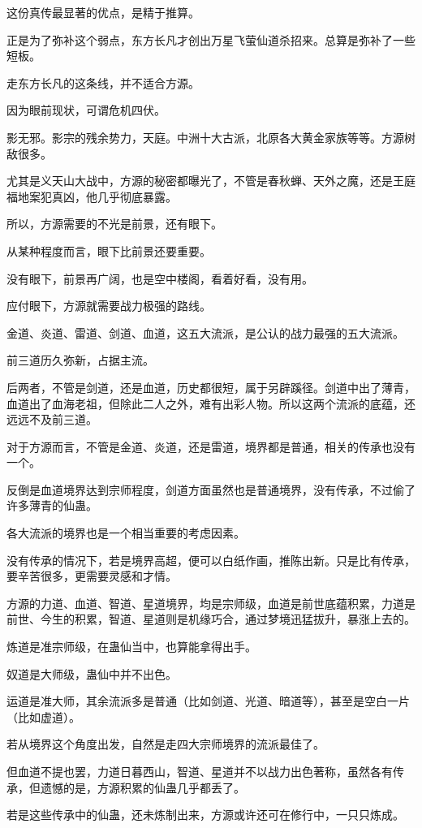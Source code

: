 \begin{this_body}
这份真传最显著的优点，是精于推算。

正是为了弥补这个弱点，东方长凡才创出万星飞萤仙道杀招来。总算是弥补了一些短板。

走东方长凡的这条线，并不适合方源。

因为眼前现状，可谓危机四伏。

影无邪。影宗的残余势力，天庭。中洲十大古派，北原各大黄金家族等等。方源树敌很多。

尤其是义天山大战中，方源的秘密都曝光了，不管是春秋蝉、天外之魔，还是王庭福地案犯真凶，他几乎彻底暴露。

所以，方源需要的不光是前景，还有眼下。

从某种程度而言，眼下比前景还要重要。

没有眼下，前景再广阔，也是空中楼阁，看着好看，没有用。

应付眼下，方源就需要战力极强的路线。

金道、炎道、雷道、剑道、血道，这五大流派，是公认的战力最强的五大流派。

前三道历久弥新，占据主流。

后两者，不管是剑道，还是血道，历史都很短，属于另辟蹊径。剑道中出了薄青，血道出了血海老祖，但除此二人之外，难有出彩人物。所以这两个流派的底蕴，还远远不及前三道。

对于方源而言，不管是金道、炎道，还是雷道，境界都是普通，相关的传承也没有一个。

反倒是血道境界达到宗师程度，剑道方面虽然也是普通境界，没有传承，不过偷了许多薄青的仙蛊。

各大流派的境界也是一个相当重要的考虑因素。

没有传承的情况下，若是境界高超，便可以白纸作画，推陈出新。只是比有传承，要辛苦很多，更需要灵感和才情。

方源的力道、血道、智道、星道境界，均是宗师级，血道是前世底蕴积累，力道是前世、今生的积累，智道、星道则是机缘巧合，通过梦境迅猛拔升，暴涨上去的。

炼道是准宗师级，在蛊仙当中，也算能拿得出手。

奴道是大师级，蛊仙中并不出色。

运道是准大师，其余流派多是普通（比如剑道、光道、暗道等），甚至是空白一片（比如虚道）。

若从境界这个角度出发，自然是走四大宗师境界的流派最佳了。

但血道不提也罢，力道日暮西山，智道、星道并不以战力出色著称，虽然各有传承，但遗憾的是，方源积累的仙蛊几乎都丢了。

若是这些传承中的仙蛊，还未炼制出来，方源或许还可在修行中，一只只炼成。


\end{this_body}
